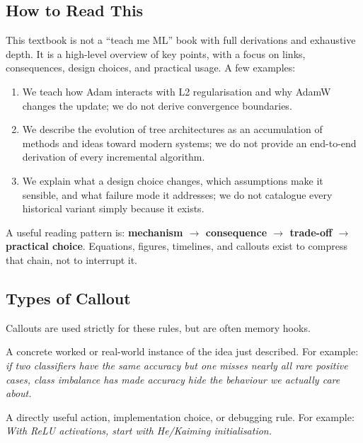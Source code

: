 \subsection*{How to Read This}

This textbook is not a ``teach me ML'' book with full derivations and exhaustive depth.
It is a high-level overview of key points, with a focus on links, consequences, design choices, and practical usage.
A few examples:

\begin{enumerate}
    \item We teach how Adam interacts with L2 regularisation and why AdamW changes the update; we do not derive convergence boundaries.
    \item We describe the evolution of tree architectures as an accumulation of methods and ideas toward modern systems; we do not provide an end-to-end derivation of every incremental algorithm.
    \item We explain what a design choice changes, which assumptions make it sensible, and what failure mode it addresses; we do not catalogue every historical variant simply because it exists.
\end{enumerate}

A useful reading pattern is: \textbf{mechanism $\rightarrow$ consequence $\rightarrow$ trade-off $\rightarrow$ practical choice}.
Equations, figures, timelines, and callouts exist to compress that chain, not to interrupt it.

\subsection*{Types of Callout}
Callouts are used strictly for these rules, but are often memory hooks. 

\begin{calloutexample}
A concrete worked or real-world instance of the idea just described.
For example: \textit{if two classifiers have the same accuracy but one misses nearly all rare positive cases, class imbalance has made accuracy hide the behaviour we actually care about.}
\end{calloutexample}

\begin{calloutpractical}
A directly useful action, implementation choice, or debugging rule.
For example: \textit{With ReLU activations, start with He/Kaiming initialisation.}
\end{calloutpractical}

